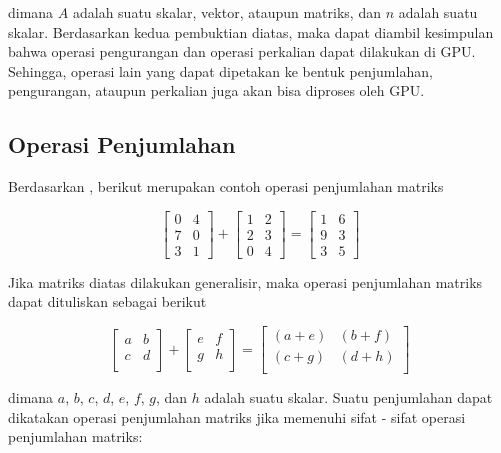 \noindent
dimana $A$ adalah suatu skalar, vektor, ataupun matriks, dan $n$ adalah suatu
skalar. Berdasarkan kedua pembuktian diatas, maka dapat diambil kesimpulan bahwa
operasi pengurangan dan operasi perkalian dapat dilakukan di GPU. Sehingga,
operasi lain yang dapat dipetakan ke bentuk penjumlahan, pengurangan, ataupun
perkalian juga akan bisa diproses oleh GPU.

\subsection{Operasi Penjumlahan}

Berdasarkan \cite{boydIntroductionAppliedLinear2018}, berikut merupakan contoh
operasi penjumlahan matriks

\[
  \begin{bmatrix}
    0 & 4 \\
    7 & 0 \\
    3 & 1
  \end{bmatrix}
  +
  \begin{bmatrix}
    1 & 2 \\
    2 & 3 \\
    0 & 4
  \end{bmatrix}
  =
  \begin{bmatrix}
    1 & 6 \\
    9 & 3 \\
    3 & 5
  \end{bmatrix}
\]

\noindent
Jika matriks diatas dilakukan generalisir, maka operasi penjumlahan matriks dapat
dituliskan sebagai berikut

\begin{equation}
  \label{eq:matrix_sum}
  \begin{bmatrix}
    a & b \\
    c & d \\
  \end{bmatrix}
  +
  \begin{bmatrix}
    e & f \\
    g & h \\
  \end{bmatrix}
  =
  \begin{bmatrix}
    (a + e) & (b + f) \\
    (c + g) & (d + h) \\
  \end{bmatrix}
\end{equation}

\noindent
dimana $a$, $b$, $c$, $d$, $e$, $f$, $g$, dan $h$ adalah suatu skalar. Suatu penjumlahan
dapat dikatakan operasi penjumlahan matriks jika memenuhi sifat - sifat operasi penjumlahan
matriks:

